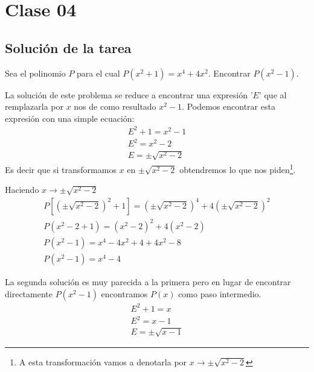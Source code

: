 
\section{Clase 04}

    \subsection{Solución de la tarea}

        \begin{section-problem}
            Sea el polinomio $P$ para el cual $P(x^2 + 1) = x^4 + 4x^2$.
            Encontrar $P(x^2 - 1)$.

            \begin{solution}[1]
                La solución de este problema se reduce a encontrar una expresión '$E$' que al remplazarla por $x$ nos de como resultado $x^2 - 1$.
                Podemos encontrar esta expresión con una simple ecuación:
                \begin{gather*}
                    E^2 + 1 = x^2 - 1 \\
                    E^2 = x^2 - 2 \\
                    E = \pm \sqrt{x^2 - 2}
                \end{gather*}
                Es decir que si transformamos $x$ en $\pm \sqrt{x^2 - 2}$ obtendremos lo que nos piden\footnote{A esta transformación vamos
                a denotarla por $x \rightarrow \pm \sqrt{x^2 - 2}$}.

                Haciendo $x \rightarrow \pm \sqrt{x^2 - 2}$
                \begin{gather*}
                    P\left[ \left(\pm \sqrt{x^2 - 2}\right)^2 + 1 \right] = \left(\pm \sqrt{x^2 - 2}\right)^4 + 4 \left(\pm \sqrt{x^2 - 2}\right)^2 \\
                    P\left( x^2 - 2 + 1 \right) = \left(x^2 - 2\right)^2 + 4 \left(x^2 - 2\right)\\
                    P\left( x^2 - 1 \right) = x^4 - 4 x^2 + 4 + 4 x^2 - 8\\
                    P\left( x^2 - 1 \right) = \boxed{x^4 - 4}
                \end{gather*}
            \end{solution}

            \begin{solution}[2]
                La segunda solución es muy parecida a la primera pero en lugar de
                encontrar directamente $P(x^2 - 1)$ encontramos $P(x)$ como paso intermedio.
                \begin{gather*}
                    E^2 + 1 = x \\
                    E^2 = x - 1 \\
                    E = \pm \sqrt{x - 1}
                \end{gather*}


\end{solution}
\end{section-problem}
